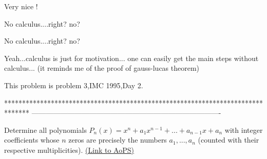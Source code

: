 \begin{solution}
	Very nice !
\end{solution}



\begin{solution}
	No calculus....right? no?
\end{solution}



\begin{solution}
	\begin{tcolorbox}No calculus....right? no?\end{tcolorbox}

Yeah...calculus is just for motivation... one can easily get the main steps without calculus... (it reminds me of the proof of gauss-lucas theorem)
\end{solution}



\begin{solution}
	This problem is problem 3,IMC 1995,Day 2.
\end{solution}
*******************************************************************************
-------------------------------------------------------------------------------

\begin{problem}
	Determine all polynomials $ P_n(x)=x^n+a_1 x^{n-1}+...+a_{n-1} x+a_n$ with integer coefficients whose $ n$ zeros are precisely the numbers $ a_1,...,a_n$ (counted with their respective multiplicities).
	\flushright \href{https://artofproblemsolving.com/community/c6h287626}{(Link to AoPS)}
\end{problem}



